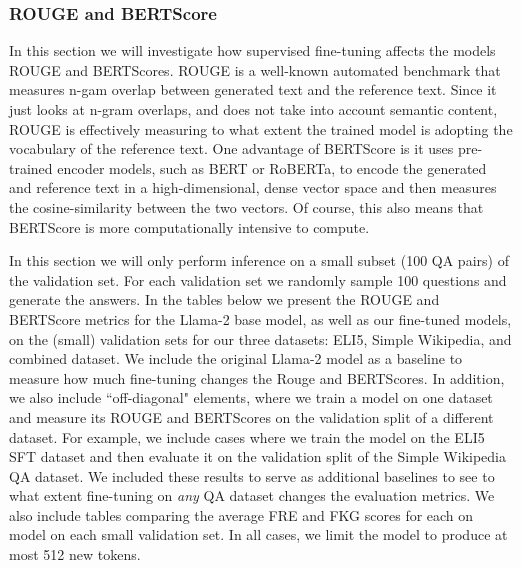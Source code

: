 \documentclass[11pt, oneside]{article}   	%
\begin{document}
\subsubsection{ROUGE and BERTScore}
In this section we will investigate how supervised fine-tuning affects the models ROUGE and BERTScores.
ROUGE is a well-known automated benchmark that measures n-gam overlap between generated text and the reference text.
Since it just looks at n-gram overlaps, and does not take into account semantic content, ROUGE is effectively measuring to what extent the trained model is adopting the vocabulary of the reference text.
One advantage of BERTScore is it uses pre-trained encoder models, such as BERT or RoBERTa, to encode the generated and reference text in a high-dimensional, dense vector space and then measures the cosine-similarity between the two vectors.
Of course, this also means that BERTScore is more computationally intensive to compute.

In this section we will only perform inference on a small subset (100 QA pairs) of the validation set. 
For each validation set we randomly sample 100 questions and generate the answers.
In the tables below we present the ROUGE and BERTScore metrics for the Llama-2 base model, as well as our fine-tuned models, on the (small) validation sets for our three datasets: ELI5, Simple Wikipedia, and combined dataset.
We include the original Llama-2 model as a baseline to measure how much fine-tuning changes the Rouge and BERTScores.
In addition, we also include ``off-diagonal" elements, where we train a model on one dataset and measure its ROUGE and BERTScores on the validation split of a different dataset.
For example, we include cases where we train the model on the ELI5 SFT dataset and then evaluate it on the validation split of the Simple Wikipedia QA dataset.
We included these results to serve as additional baselines to see to what extent fine-tuning on \textit{any} QA dataset changes the evaluation metrics.
We also include tables comparing the average FRE and FKG scores for each on model on each small validation set.
In all cases, we limit the model to produce at most 512 new tokens.
\end{document}
